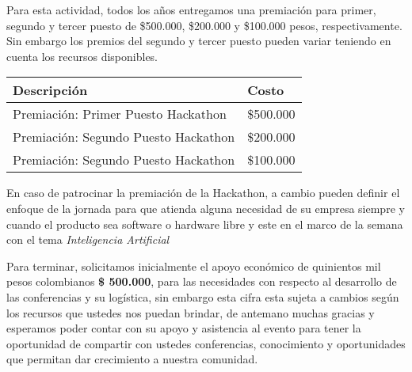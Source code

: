 Para esta actividad, todos los años entregamos una premiaci\'on para primer, segundo y tercer puesto de \$500.000, \$200.000 y \$100.000 pesos, respectivamente. Sin embargo los premios del segundo y tercer puesto pueden variar teniendo en cuenta los recursos disponibles.


\begin{table}
\begin{center}
\begin{tabular}{|l|l|}
\hline
Descripción & Costo \\
\hline \hline
Premiaci\'on: Primer Puesto Hackathon & \$500.000 \\ \hline
Premiaci\'on: Segundo Puesto Hackathon & \$200.000 \\ \hline
Premiaci\'on: Segundo Puesto Hackathon & \$100.000 \\ \hline
\end{tabular}
\end{center}
\end{table}


En caso de patrocinar la premiaci\'on de la Hackathon, a cambio pueden definir el enfoque de la jornada para que atienda alguna necesidad de su empresa siempre y cuando el producto sea software o hardware libre y este en el marco de la semana con el tema \textit{Inteligencia Artificial} 


Para terminar, solicitamos inicialmente el apoyo económico de  quinientos mil pesos colombianos \textbf{\$ 500.000}, para las necesidades con respecto al desarrollo de las conferencias y su logística, sin embargo esta cifra esta sujeta a cambios según los recursos que ustedes nos puedan brindar, de antemano muchas gracias y  esperamos poder contar con su apoyo y asistencia al evento para tener la oportunidad de compartir con ustedes conferencias, conocimiento y oportunidades que permitan dar crecimiento a nuestra comunidad.